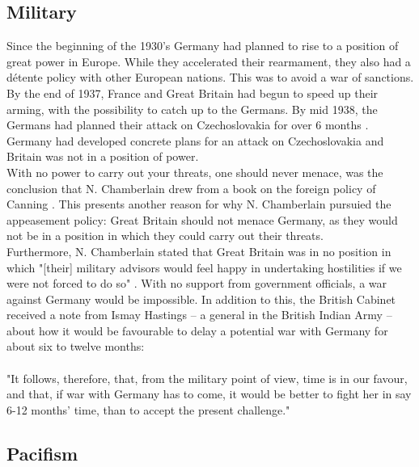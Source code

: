 \documentclass[10pt, a4papert, hidelinks]{article}
\begin{document}
\subsection{Military} %


Since the beginning of the 1930's Germany had planned to rise to a position of great power in Europe. While they accelerated their rearmament, they also had a détente policy with other European nations. This was to avoid a war of sanctions. By the end of 1937, France and Great Britain had begun to speed up their arming, with the possibility to catch up to the Germans. By mid 1938, the Germans had planned their attack on Czechoslovakia for over 6 months \cite{muenchen_ende_altes_europa}.\\
Germany had developed concrete plans for an attack on Czechoslovakia and Britain was not in a position of power.\\
With no power to carry out your threats, one should never menace, was the conclusion that N. Chamberlain drew from a book on the foreign policy of Canning \cite{chamberlain_neville_2000}. This presents another reason for why N. Chamberlain pursuied the appeasement policy: Great Britain should not menace Germany, as they would not be in a position in which they could carry out their threats.\\
Furthermore, N. Chamberlain stated that Great Britain was in no position in which "[their] military advisors would feel happy in undertaking hostilities if we were not forced to do so" \cite{chamberlain_neville_2000}. With no support from government officials, a war against Germany would be impossible. In addition to this, the British Cabinet received a note from Ismay Hastings -- a general in the British Indian Army -- about how it would be favourable to delay a potential war with Germany for about six to twelve months:\\\\
"It follows, therefore, that, from the military point of view, time is in our favour, and that, if war with Germany has to come, it would be better to fight her in say 6-12 months’ time, than to accept the present challenge." \cite{ismay1938}

\subsection{Pacifism} %
\end{document}
